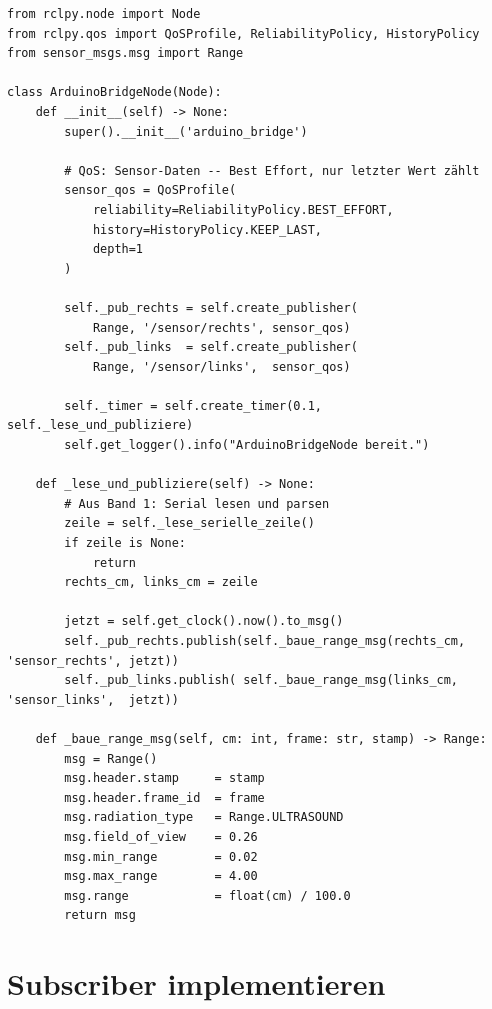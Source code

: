 \begin{lstlisting}
from rclpy.node import Node
from rclpy.qos import QoSProfile, ReliabilityPolicy, HistoryPolicy
from sensor_msgs.msg import Range

class ArduinoBridgeNode(Node):
    def __init__(self) -> None:
        super().__init__('arduino_bridge')

        # QoS: Sensor-Daten -- Best Effort, nur letzter Wert zählt
        sensor_qos = QoSProfile(
            reliability=ReliabilityPolicy.BEST_EFFORT,
            history=HistoryPolicy.KEEP_LAST,
            depth=1
        )

        self._pub_rechts = self.create_publisher(
            Range, '/sensor/rechts', sensor_qos)
        self._pub_links  = self.create_publisher(
            Range, '/sensor/links',  sensor_qos)

        self._timer = self.create_timer(0.1, self._lese_und_publiziere)
        self.get_logger().info("ArduinoBridgeNode bereit.")

    def _lese_und_publiziere(self) -> None:
        # Aus Band 1: Serial lesen und parsen
        zeile = self._lese_serielle_zeile()
        if zeile is None:
            return
        rechts_cm, links_cm = zeile

        jetzt = self.get_clock().now().to_msg()
        self._pub_rechts.publish(self._baue_range_msg(rechts_cm, 'sensor_rechts', jetzt))
        self._pub_links.publish( self._baue_range_msg(links_cm,  'sensor_links',  jetzt))

    def _baue_range_msg(self, cm: int, frame: str, stamp) -> Range:
        msg = Range()
        msg.header.stamp     = stamp
        msg.header.frame_id  = frame
        msg.radiation_type   = Range.ULTRASOUND
        msg.field_of_view    = 0.26
        msg.min_range        = 0.02
        msg.max_range        = 4.00
        msg.range            = float(cm) / 100.0
        return msg
\end{lstlisting}

\section{Subscriber implementieren}

